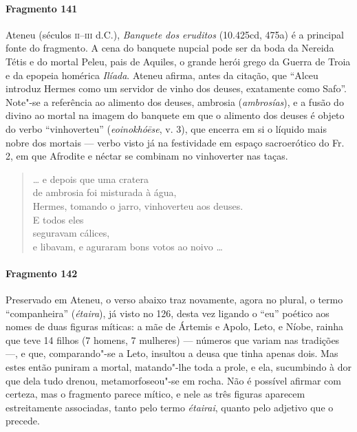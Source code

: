 {\paragraph{Fragmento 141}

Ateneu (séculos \textsc{ii--iii} d.C.), \textit{Banquete dos eruditos} (10.425cd, 475a) é a principal fonte do fragmento. A cena  do  banquete nupcial pode ser da boda da Nereida Tétis e do mortal Peleu, pais de Aquiles, o grande herói grego da Guerra de Troia e da epopeia homérica \textit{Ilíada}. Ateneu afirma, antes da citação, que “Alceu introduz Hermes como um servidor de vinho dos deuses, exatamente como Safo”. Note"-se a referência ao alimento dos deuses, ambrosia (\textit{ambrosías}), e a fusão do divino ao mortal na imagem do banquete em que o alimento dos deuses é objeto do verbo ``vinhoverteu'' (\textit{eoinokhóēse}, v. 3), que encerra em si o líquido mais nobre dos mortais --- verbo visto já na festividade em espaço sacroerótico do Fr. 2, em que Afrodite e néctar se combinam no vinhoverter nas taças.

\begin{verse}
\ldots{} e depois que uma cratera\\
de ambrosia foi misturada à água,\\
Hermes, tomando o jarro, vinhoverteu aos deuses.\\
E todos eles\\
seguravam cálices,\\
e libavam, e aguraram bons votos ao noivo \ldots{}
\end{verse}

\paragraph{Fragmento 142}

{\small Preservado em Ateneu, o verso abaixo traz novamente,
agora no plural, o termo ``companheira” (\textit{étaira}), já visto no
126, desta vez ligando o “eu” poético aos nomes de duas figuras míticas: a mãe de
Ártemis e Apolo, Leto, e Níobe, rainha que teve 14 filhos (7 homens, 7
mulheres) --- números que variam nas tradições ---, e que, comparando"-se a Leto, insultou a deusa que tinha apenas dois.
Mas estes então puniram a mortal, matando"-lhe toda a prole, e ela, sucumbindo à dor que dela tudo drenou, metamorfoseou"-se em rocha. Não é possível afirmar
com certeza, mas o fragmento parece mítico, e nele as três figuras aparecem
estreitamente associadas, tanto pelo termo \textit{étairai}, quanto pelo
adjetivo que o precede.}

}
